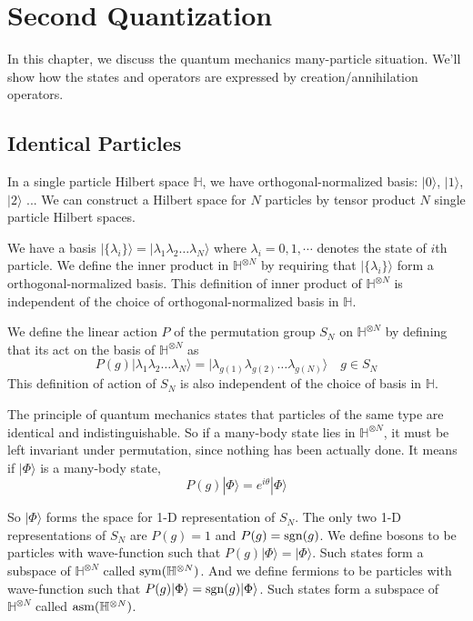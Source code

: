 \documentclass[12pt]{book}
\begin{document}
	
	\chapter{Second Quantization}
	
	In this chapter, we discuss the quantum mechanics many-particle situation. We'll show how the states and operators are expressed by creation/annihilation operators.
	\section{Identical Particles}
	
	In a single particle Hilbert space $\mathbb H$, we have orthogonal-normalized basis: $|0\rangle$, $|1\rangle$, $|2\rangle$ ... We can construct a Hilbert space for $N$ particles by tensor product $N$ single particle Hilbert spaces.
	
	We have a basis $|\{\lambda_i\}\rangle=|\lambda_1\lambda_2\dots\lambda_N\rangle$ where $\lambda_i=0,1,\cdots$ denotes the state of $i$th particle. We define the inner product in $\mathbb H^{\otimes N}$ by requiring that $|\{\lambda_i\}\rangle$ form a orthogonal-normalized basis. This definition of inner product of $\mathbb H^{\otimes N}$ is independent of the choice of orthogonal-normalized basis in $\mathbb H$.
	
	
	We define the linear action $P$ of the permutation group $S_N$ on $\mathbb H^{\otimes N}$ by defining that its act on the basis of $\mathbb H^{\otimes N}$ as
	\begin{equation}
		P(g)|\lambda_1\lambda_2\dots\lambda_N\rangle=|\lambda_{g(1)}\lambda_{g(2)}\dots\lambda_{g(N)}\rangle\quad g\in S_N
	\end{equation}
	This definition of action of $S_N$ is also independent of the choice of basis in $\mathbb H$.
	
	
	The principle of quantum mechanics states that particles of the same type are identical and indistinguishable. So if a many-body state lies in $\mathbb H^{\otimes N}$, it must be left invariant under permutation, since nothing has been actually done. It means if $|\Phi\rangle$ is a many-body state,
	\begin{equation}
		P(g)|\Phi\rangle=e^{i\theta}|\Phi\rangle
	\end{equation}
	
	So $|\Phi\rangle$ forms the space for 1-D representation of $S_N$. The only two 1-D representations of $S_N$ are $P(g)=1$ and $P(g)={\rm sgn}(g)$. We define bosons to be particles with wave-function such that $P(g)|\Phi\rangle=|\Phi\rangle$. Such states form a subspace of $\mathbb H^{\otimes N}$ called ${\rm sym}(\mathbb H^{\otimes N})$. And we define fermions to be particles with wave-function such that $P(g)|\Phi\rangle={\rm sgn}(g)|\Phi\rangle$. Such states form a subspace of $\mathbb H^{\otimes N}$ called ${\rm asm}(\mathbb H^{\otimes N})$.
	
\end{document}
